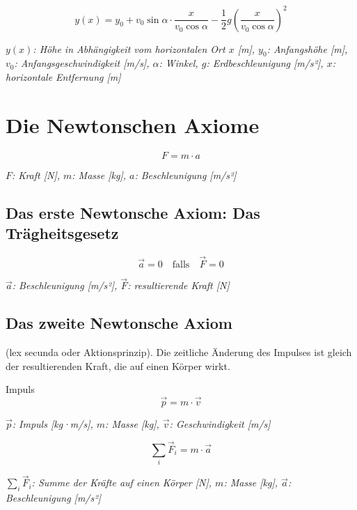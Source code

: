 \documentclass[a5paper,10pt]{article}
\newenvironment{displayformula}
{
	\begin{framed}
		\color{formulaColor}
	}
	{\end{framed}}
\newcommand{\formulalegend}[1]{%
	\par\vspace{0.5ex}%
	{{\color{legendColor}\RaggedRight\small\textit{#1}}}%
	\par\vspace{1.5ex}%
}
\begin{document}
\begin{displayformula}
	\[
	y(x) = y_0 + v_0\sin\alpha \cdot \frac{x}{v_0 \cos\alpha} - \frac{1}{2} g \left(\frac{x}{v_0\cos\alpha}\right)^2
	\]
\end{displayformula}
\formulalegend{
	\( y(x) \): Höhe in Abhängigkeit vom horizontalen Ort \( x \) [m], \( y_0 \): Anfangshöhe [m], \( v_0 \): Anfangsgeschwindigkeit [m/s], \( \alpha \): Winkel, \( g \): Erdbeschleunigung [m/s²], \( x \): horizontale Entfernung [m]
}
\newpage


\section{Die Newtonschen Axiome}

\begin{displayformula}
	\[
	F = m \cdot a
	\]
\end{displayformula}
\formulalegend{
	\( F \): Kraft [N], \( m \): Masse [kg], \( a \): Beschleunigung [m/s²]
}

\subsection{Das erste Newtonsche Axiom: Das Trägheitsgesetz}

\begin{displayformula}
	\[
	\vec{a} = 0 \quad \text{falls} \quad \vec{F} = 0
	\]
\end{displayformula}
\formulalegend{
	\( \vec{a} \): Beschleunigung [m/s²], \( \vec{F} \): resultierende Kraft [N]
}

\subsection{Das zweite Newtonsche Axiom}

\begin{displayformula}
	(lex secunda oder Aktionsprinzip). Die zeitliche Änderung des Impulses ist gleich der  
	resultierenden Kraft, die auf einen Körper wirkt.
\end{displayformula}

\begin{displayformula}
	Impuls
	\[
	\vec{p} = m \cdot \vec{v}
	\]
\end{displayformula}
\formulalegend{
	\( \vec{p} \): Impuls [kg·m/s], \( m \): Masse [kg], \( \vec{v} \): Geschwindigkeit [m/s]
}

\begin{displayformula}
	\[
	\sum_{i} \vec{F}_i = m \cdot \vec{a}
	\]
\end{displayformula}
\formulalegend{
	\( \sum_{i} \vec{F}_i \): Summe der Kräfte auf einen Körper [N], \( m \): Masse [kg], \( \vec{a} \): Beschleunigung [m/s²]
}
\end{document}
